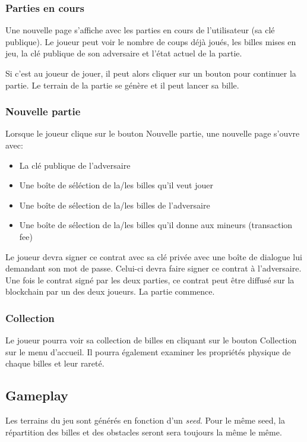 \documentclass{article}
\begin{document}
\subsubsection{Parties en cours}
Une nouvelle page s'affiche avec les parties en cours de l'utilisateur (sa clé publique). Le joueur peut voir le nombre de coups déjà joués, les billes mises en jeu, la clé publique de son adversaire et l'état actuel de la partie.

Si c'est au joueur de jouer, il peut alors cliquer sur un bouton pour continuer la partie. Le terrain de la partie se génère et il peut lancer sa bille.

\subsubsection{Nouvelle partie}
Lorsque le joueur clique sur le bouton Nouvelle partie, une nouvelle page s'ouvre avec:
\begin{itemize}
    \item La clé publique de l'adversaire
    \item Une boîte de séléction de la/les billes qu'il veut jouer
    \item Une boîte de sélection de la/les billes de l'adversaire
    \item Une boîte de sélection de la/les billes qu'il donne aux mineurs (transaction fee)
\end{itemize}

Le joueur devra signer ce contrat avec sa clé privée avec une boîte de dialogue lui demandant son mot de passe. Celui-ci devra faire signer ce contrat à l'adversaire. Une fois le contrat signé par les deux parties, ce contrat peut être diffusé sur la blockchain par un des deux joueurs. La partie commence.

\subsubsection{Collection}
Le joueur pourra voir sa collection de billes en cliquant sur le bouton Collection sur le menu d'accueil. Il pourra également examiner les propriétés physique de chaque billes et leur rareté.

\subsection{Gameplay}
Les terrains du jeu sont générés en fonction d'un \textit{seed}. Pour le même seed, la répartition des billes et des obstacles seront sera toujours la même le même.
\end{document}
